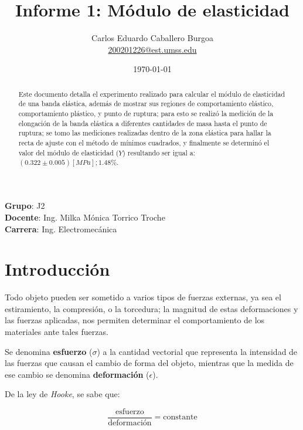 \documentclass[letter,11pt]{article}
\title{Informe 1: Módulo de elasticidad}
\author{Carlos Eduardo Caballero Burgoa \\
    \small{\href{mailto:200201226@est.umss.edu}{200201226@est.umss.edu}}
}
\date{\today}
\begin{document}
\maketitle
\begin{center}
    \textbf{Grupo}: J2\\
    \textbf{Docente}: Ing. Milka Mónica Torrico Troche\\
    \textbf{Carrera}: Ing. Electromecánica
\end{center}

\begin{abstract}
Este documento detalla el experimento realizado para calcular el módulo de
elasticidad de una banda elástica, además de mostrar sus regiones de
comportamiento elástico, comportamiento plástico, y punto de ruptura; para esto
se realizó la medición de la elongación de la banda elástica a diferentes
cantidades de masa hasta el punto de ruptura; se tomo las mediciones realizadas
dentro de la zona elástica para hallar la recta de ajuste con el método de
mínimos cuadrados, y finalmente se determinó el valor del módulo de elasticidad
($Y$) resultando ser igual a: $(0.322 \pm 0.005)[MPa]; 1.48\%$.
\end{abstract}

\section{Introducción}

Todo objeto pueden ser sometido a varios tipos de fuerzas externas, ya sea el
estiramiento, la compresión, o la torcedura; la magnitud de estas deformaciones
y las fuerzas aplicadas, nos permiten determinar el comportamiento de los
materiales ante tales fuerzas.

Se denomina \textbf{esfuerzo} ($\sigma$) a la cantidad vectorial que representa
la intensidad de las fuerzas que causan el cambio de forma del objeto, mientras
que la medida de ese cambio se denomina \textbf{deformación} ($\epsilon$).

De la ley de \emph{Hooke}, se sabe que:

\begin{equation}
    \frac{\text{esfuerzo}}{\text{deformación}} = \text{constante}
\label{hooke}
\end{equation}
\vspace{0.10cm}
\end{document}

